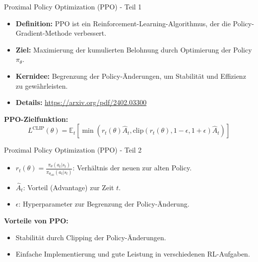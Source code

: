 \documentclass[aspectratio=1610, xcolor=dvipsnames, 9pt]{beamer}
\begin{document}
\begin{frame}{Proximal Policy Optimization (PPO) - Teil 1}
  \begin{itemize}
    \item \textbf{Definition:} PPO ist ein Reinforcement-Learning-Algorithmus, der die Policy-Gradient-Methode verbessert.
    \item \textbf{Ziel:} Maximierung der kumulierten Belohnung durch Optimierung der Policy \( \pi_\theta \).
    \item \textbf{Kernidee:} Begrenzung der Policy-Änderungen, um Stabilität und Effizienz zu gewährleisten.
    \item \textbf{Details:} \url{https://arxiv.org/pdf/2402.03300}
  \end{itemize}
  \vspace{0.5cm}
  \textbf{PPO-Zielfunktion:}
  \[
  L^{\mathrm{CLIP}}(\theta) = \mathbb{E}_t \left[ \min \left( r_t(\theta) \hat{A}_t, \mathrm{clip}(r_t(\theta), 1-\epsilon, 1+\epsilon) \hat{A}_t \right) \right]
  \]
\end{frame}

\begin{frame}{Proximal Policy Optimization (PPO) - Teil 2}
  \begin{itemize}
    \item \( r_t(\theta) = \frac{\pi_\theta(a_t|s_t)}{\pi_{\theta_{\text{old}}}(a_t|s_t)} \): Verhältnis der neuen zur alten Policy.
    \item \( \hat{A}_t \): Vorteil (Advantage) zur Zeit \( t \).
    \item \( \epsilon \): Hyperparameter zur Begrenzung der Policy-Änderung.
  \end{itemize}
  \vspace{0.5cm}
  \textbf{Vorteile von PPO:}
  \begin{itemize}
    \item Stabilität durch Clipping der Policy-Änderungen.
    \item Einfache Implementierung und gute Leistung in verschiedenen RL-Aufgaben.
  \end{itemize}
\end{frame}
\end{document}
